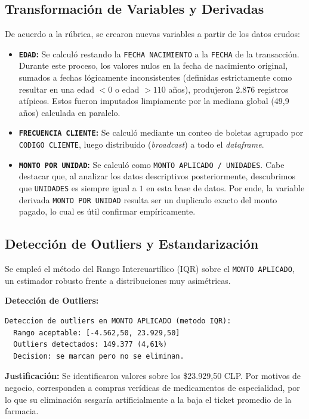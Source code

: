 \documentclass[12pt,letterpaper]{article}
\begin{document}
\subsection{Transformación de Variables y Derivadas}
De acuerdo a la rúbrica, se crearon nuevas variables a partir de los datos crudos:
\begin{itemize}
    \item \textbf{\texttt{EDAD}:} Se calculó restando la \texttt{FECHA NACIMIENTO} a la \texttt{FECHA} de la transacción. Durante este proceso, los valores nulos en la fecha de nacimiento original, sumados a fechas lógicamente inconsistentes (definidas estrictamente como resultar en una edad $< 0$ o edad $> 110$ años), produjeron 2.876 registros atípicos. Estos fueron imputados limpiamente por la mediana global (49,9 años) calculada en paralelo.
    \item \textbf{\texttt{FRECUENCIA CLIENTE}:} Se calculó mediante un conteo de boletas agrupado por \texttt{CODIGO CLIENTE}, luego distribuido (\textit{broadcast}) a todo el \textit{dataframe}.
    \item \textbf{\texttt{MONTO POR UNIDAD}:} Se calculó como \texttt{MONTO APLICADO / UNIDADES}. Cabe destacar que, al analizar los datos descriptivos posteriormente, descubrimos que \texttt{UNIDADES} es siempre igual a $1$ en esta base de datos. Por ende, la variable derivada \texttt{MONTO POR UNIDAD} resulta ser un duplicado exacto del monto pagado, lo cual es útil confirmar empíricamente.
\end{itemize}

\subsection{Detección de Outliers y Estandarización}
Se empleó el método del Rango Intercuartílico (IQR) sobre el \texttt{MONTO APLICADO}, un estimador robusto frente a distribuciones muy asimétricas.

\vspace{0.4cm}
\noindent\textbf{Detección de Outliers:}
\begin{verbatim}
Deteccion de outliers en MONTO APLICADO (metodo IQR):
  Rango aceptable: [-4.562,50, 23.929,50]
  Outliers detectados: 149.377 (4,61%)
  Decision: se marcan pero no se eliminan.
\end{verbatim}
\vspace{0.4cm}
\textbf{Justificación:} Se identificaron valores sobre los \$23.929,50 CLP. Por motivos de negocio, corresponden a compras verídicas de medicamentos de especialidad, por lo que su eliminación sesgaría artificialmente a la baja el ticket promedio de la farmacia. 
\end{document}
